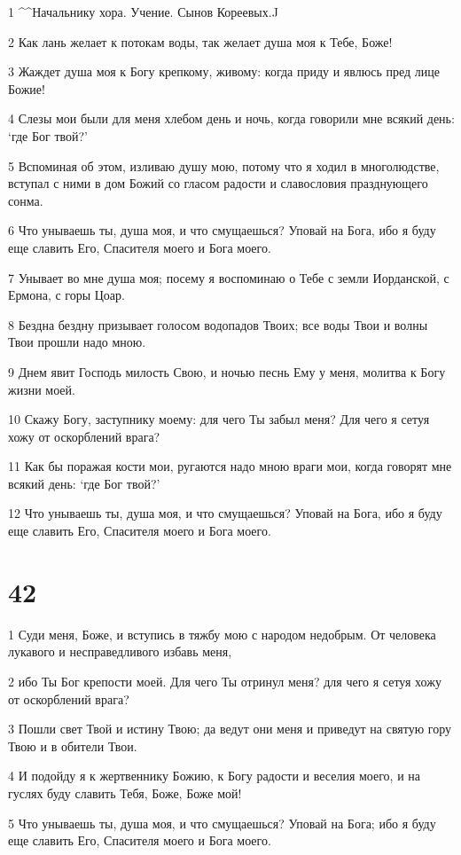\par 1 ^^Начальнику хора. Учение. Сынов Кореевых.^^
\par 2 Как лань желает к потокам воды, так желает душа моя к Тебе, Боже!
\par 3 Жаждет душа моя к Богу крепкому, живому: когда приду и явлюсь пред лице Божие!
\par 4 Слезы мои были для меня хлебом день и ночь, когда говорили мне всякий день: `где Бог твой?'
\par 5 Вспоминая об этом, изливаю душу мою, потому что я ходил в многолюдстве, вступал с ними в дом Божий со гласом радости и славословия празднующего сонма.
\par 6 Что унываешь ты, душа моя, и что смущаешься? Уповай на Бога, ибо я буду еще славить Его, Спасителя моего и Бога моего.
\par 7 Унывает во мне душа моя; посему я воспоминаю о Тебе с земли Иорданской, с Ермона, с горы Цоар.
\par 8 Бездна бездну призывает голосом водопадов Твоих; все воды Твои и волны Твои прошли надо мною.
\par 9 Днем явит Господь милость Свою, и ночью песнь Ему у меня, молитва к Богу жизни моей.
\par 10 Скажу Богу, заступнику моему: для чего Ты забыл меня? Для чего я сетуя хожу от оскорблений врага?
\par 11 Как бы поражая кости мои, ругаются надо мною враги мои, когда говорят мне всякий день: `где Бог твой?'
\par 12 Что унываешь ты, душа моя, и что смущаешься? Уповай на Бога, ибо я буду еще славить Его, Спасителя моего и Бога моего.

\chapter{42}

\par 1 Суди меня, Боже, и вступись в тяжбу мою с народом недобрым. От человека лукавого и несправедливого избавь меня,
\par 2 ибо Ты Бог крепости моей. Для чего Ты отринул меня? для чего я сетуя хожу от оскорблений врага?
\par 3 Пошли свет Твой и истину Твою; да ведут они меня и приведут на святую гору Твою и в обители Твои.
\par 4 И подойду я к жертвеннику Божию, к Богу радости и веселия моего, и на гуслях буду славить Тебя, Боже, Боже мой!
\par 5 Что унываешь ты, душа моя, и что смущаешься? Уповай на Бога; ибо я буду еще славить Его, Спасителя моего и Бога моего.

